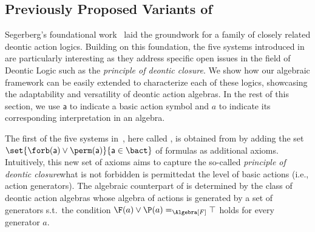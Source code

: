 \subsection{Previously Proposed Variants of \DAL}\label{section:dals}

Segerberg's foundational work~\cite{Segerberg1982} laid the groundwork for a family of closely related deontic action logics. Building on this foundation, the five systems introduced in~\cite{Trypuz15} are particularly interesting as they address specific open issues in the field of Deontic Logic \textemdash such as the \emph{principle of deontic closure}.
We show how our algebraic framework can be easily extended to characterize each of these logics, showcasing the adaptability and versatility of deontic action algebras.
In the rest of this section, we use $\mathsf{a}$ to indicate a basic action symbol and $a$ to indicate its corresponding interpretation in an algebra.

%
%

The first of the five systems in~\cite{Trypuz15}, here called , is obtained from \DAL by adding the set $\set{{\forb(\mathsf{a}) \lor \perm(\mathsf{a})}}{\mathsf{a} \in \bact}$ of formulas as additional axioms.
Intuitively, this new set of axioms aims to capture the so-called \emph{principle of deontic closure}\textemdash what is not forbidden is permitted\textemdash at the level of basic actions (i.e., action generators).
The algebraic counterpart of  is determined by the class of deontic action algebras whose algebra of actions is generated by a set of generators s.t.\ the condition $\F(a) \lor \P(a) =_{\Algebra[F]} \top$ holds for every generator $a$.

